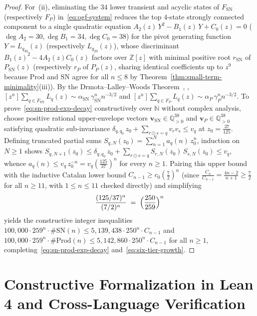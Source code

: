 \documentclass[11pt,reqno]{amsart}
\numberwithin{equation}{section}
\theoremstyle{plain}
\theoremstyle{definition}
\theoremstyle{remark}
\newcommand{\SN}{\mathrm{SN}}
\newcommand{\Prod}{\mathrm{Prod}}
\begin{document}
\begin{proof}
For~(ii), eliminating the $34$ lower transient and acyclic states of $F_{\SN}$ (respectively $F_P$) in~\eqref{eq:ogf-system} reduces the top $4$-state strongly connected component to a single quadratic equation $A_2(z)\,Y^2 - B_1(z)\,Y + C_0(z) = 0$ ($\deg A_2 = 30, \deg B_1 = 34, \deg C_0 = 38$) for the pivot generating function $Y = L_{q_{30}}(z)$ (respectively $L_{q_{29}}(z)$), whose discriminant $B_1(z)^2 - 4 A_2(z) C_0(z)$ factors over $\mathbb{Z}[z]$ with minimal positive root $r_{\SN}$ of $P_{\SN}(z)$ (respectively $r_P$ of $P_P(z)$, sharing identical coefficients up to $z^9$ because $\Prod$ and $\SN$ agree for all $n \le 8$ by Theorem~\ref{thm:small-term-minimality}(iii)). By the Drmota--Lalley--Woods Theorem~\cite{Drmota1997,Woods1998}, \cite[Theorem~VII.6]{FlajoletSedgewick2009}, $[z^n] \sum_{q \in F_{\SN}} L_q(z) \sim \alpha_{\SN}\,\gamma_{\SN}^n n^{-3/2}$ and $[z^n] \sum_{q \in F_P} L_q(z) \sim \alpha_P\,\gamma_P^n n^{-3/2}$. To prove~\eqref{eq:sn-prod-exp-decay} constructively over $\mathbb{N}$ without complex analysis, choose positive rational upper-envelope vectors $\mathbf{v}_{\SN} \in \mathbb{Q}_{>0}^{38}$ and $\mathbf{v}_P \in \mathbb{Q}_{>0}^{38}$ satisfying quadratic sub-invariance $\delta_{q, q_0}\,z_0 + \sum_{r \odot s = q} v_r v_s \le v_q$ at $z_0 = \frac{37}{125}$. Defining truncated partial sums $S_{q, N}(z_0) = \sum_{n=1}^N a_q(n)\,z_0^n$, induction on $N \ge 1$ shows $S_{q, N+1}(z_0) \le \delta_{q, q_0}\,z_0 + \sum_{r \odot s = q} S_{r, N}(z_0)\,S_{s, N}(z_0) \le v_q$, whence $a_q(n) \le v_q\,z_0^{-n} = v_q (\frac{125}{37})^n$ for every $n \ge 1$. Pairing this upper bound with the inductive Catalan lower bound $C_{n-1} \ge c_0 (\frac{7}{2})^n$ (since $\frac{C_n}{C_{n-1}} = \frac{4n-2}{n+1} \ge \frac{7}{2}$ for all $n \ge 11$, with $1 \le n \le 11$ checked directly) and simplifying
\[
\frac{(125 / 37)^n}{(7 / 2)^n} \;=\; \Bigl(\frac{250}{259}\Bigr)^n
\]
yields the constructive integer inequalities $100{,}000 \cdot 259^n \cdot \#\SN(n) \le 5{,}139{,}438 \cdot 250^n \cdot C_{n-1}$ and $100{,}000 \cdot 259^n \cdot \#\Prod(n) \le 5{,}142{,}860 \cdot 250^n \cdot C_{n-1}$ for all $n \ge 1$, completing~\eqref{eq:sn-prod-exp-decay} and~\eqref{eq:six-tier-growth}.
\end{proof}


\section{Constructive Formalization in Lean 4 and Cross-Language Verification}
\label{sec:formalization}
\end{document}
